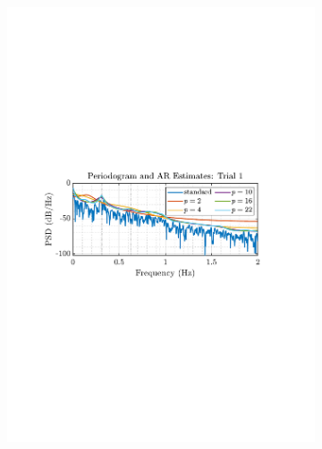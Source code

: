\documentclass[12pt]{article}
\numberwithin{equation}{section}
\begin{document}
		\begin{figure}[H]
			\begin{subfigure}{0.49\textwidth}
				\includegraphics[trim={2.2cm 11.2cm 3.15cm  11.2cm}, clip, width=\textwidth]{../MATLAB/figures/q1_5c_fig01.pdf} 
				\caption{}
			\end{subfigure}
			\begin{subfigure}{0.49\textwidth}

\end{subfigure}
\end{figure}
\end{document}
